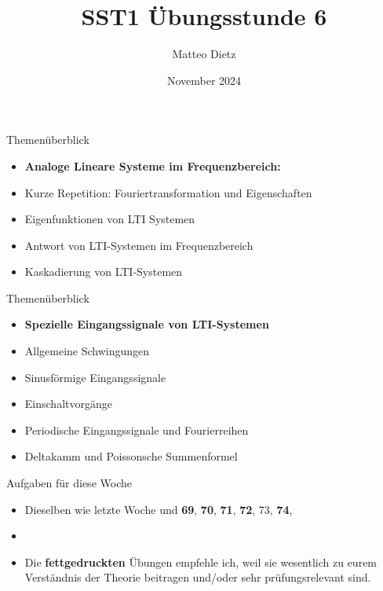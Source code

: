 \documentclass[14pt, aspectratio=169, handout]{beamer}
\title{SST1 Übungsstunde 6}
\author{Matteo Dietz}
\date{November 2024}
\begin{document}
\maketitle

\begin{frame}{Themenüberblick}
    \begin{itemize}
        \item \textbf{Analoge Lineare Systeme im Frequenzbereich:}
        \item[] Kurze Repetition: Fouriertransformation und Eigenschaften
        \item[] Eigenfunktionen von LTI Systemen
        \item[] Antwort von LTI-Systemen im Frequenzbereich
        \item[] Kaskadierung von LTI-Systemen
    \end{itemize}
\end{frame}

\begin{frame}{Themenüberblick}
    \begin{itemize}
        \item \textbf{Spezielle Eingangssignale von LTI-Systemen}
        \item[] Allgemeine Schwingungen
        \item[] Sinusförmige Eingangssignale 
        \item[] Einschaltvorgänge
        \item[] Periodische Eingangssignale und Fourierreihen
        \item[] Deltakamm und Poissonsche Summenformel
    \end{itemize}
\end{frame}

\begin{frame}{Aufgaben für diese Woche}
    \begin{itemize}
        \item[] Dieselben wie letzte Woche und \textbf{69}, \textbf{70}, \textbf{71}, \textbf{72}, 73, \textbf{74}, 
        \item[] 
        \item[] Die \textbf{fettgedruckten} Übungen empfehle ich, weil sie wesentlich zu eurem Verständnis der Theorie beitragen und/oder sehr prüfungsrelevant sind.
    \end{itemize}
\end{frame}
\end{document}
